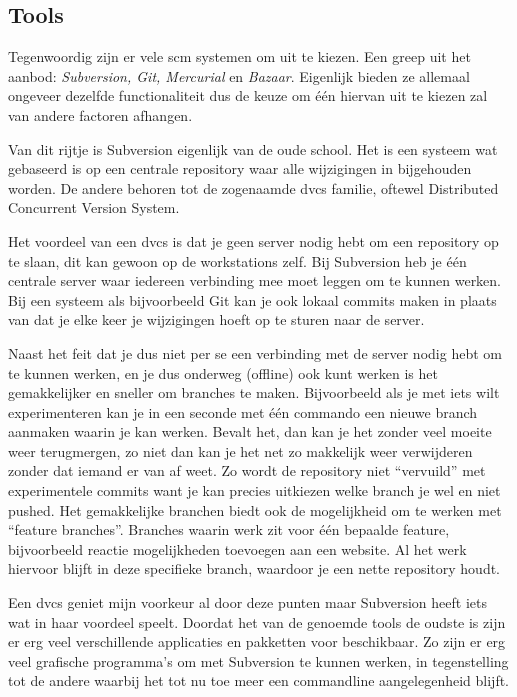 \subsection{Tools}

Tegenwoordig zijn er vele {\sc scm} systemen om uit te kiezen. Een greep uit het aanbod: \emph{Subversion, Git, Mercurial} en \emph{Bazaar}. Eigenlijk bieden ze allemaal ongeveer dezelfde functionaliteit dus de keuze om \'{e}\'{e}n hiervan uit te kiezen zal van andere factoren afhangen.

Van dit rijtje is Subversion eigenlijk van de oude school. Het is een systeem wat gebaseerd is op een centrale repository waar alle wijzigingen in bijgehouden worden. De andere behoren tot de zogenaamde {\sc dvcs} familie, oftewel Distributed Concurrent Version System.

Het voordeel van een {\sc dvcs} is dat je geen server nodig hebt om een repository op te slaan, dit kan gewoon op de workstations zelf. Bij Subversion heb je \'{e}\'{e}n centrale server waar iedereen verbinding mee moet leggen om te kunnen werken. Bij een systeem als bijvoorbeeld Git kan je ook lokaal commits maken in plaats van dat je elke keer je wijzigingen hoeft op te sturen naar de server. 

Naast het feit dat je dus niet per se een verbinding met de server nodig hebt om te kunnen werken, en je dus onderweg (offline) ook kunt werken is het gemakkelijker en sneller om branches te maken. Bijvoorbeeld als je met iets wilt experimenteren kan je in een seconde met \'{e}\'{e}n commando een nieuwe branch aanmaken waarin je kan werken. Bevalt het, dan kan je het zonder veel moeite weer terugmergen, zo niet dan kan je het net zo makkelijk weer verwijderen zonder dat iemand er van af weet. Zo wordt de repository niet ``vervuild'' met experimentele commits want je kan precies uitkiezen welke branch je wel en niet pushed. Het gemakkelijke branchen biedt ook de mogelijkheid om te werken met ``feature branches''. Branches waarin werk zit voor \'{e}\'{e}n bepaalde feature, bijvoorbeeld reactie mogelijkheden toevoegen aan een website. Al het werk hiervoor blijft in deze specifieke branch, waardoor je een nette repository houdt.

Een {\sc dvcs} geniet mijn voorkeur al door deze punten maar Subversion heeft iets wat in haar voordeel speelt. Doordat het van de genoemde tools de oudste is zijn er erg veel verschillende applicaties en pakketten voor beschikbaar. Zo zijn er erg veel grafische programma's om met Subversion te kunnen werken, in tegenstelling tot de andere waarbij het tot nu toe meer een commandline aangelegenheid blijft.

